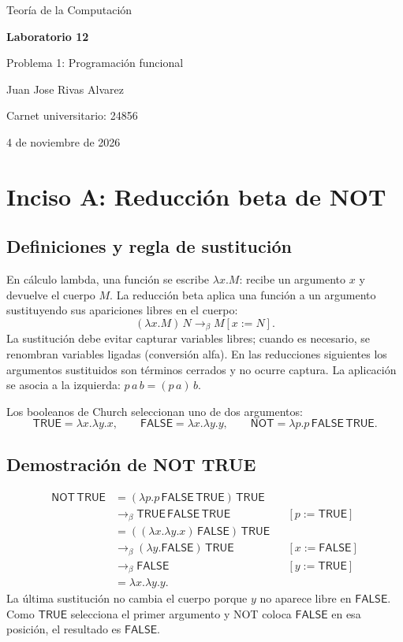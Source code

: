 \documentclass[11pt,a4paper]{article}
\newcommand{\TRUE}{\mathsf{TRUE}}
\newcommand{\FALSE}{\mathsf{FALSE}}
\newcommand{\NOT}{\mathsf{NOT}}
\begin{document}
\hypersetup{pageanchor=false}
\begin{titlepage}
    \centering
    \vspace*{2cm}
    {\Large Teoría de la Computación\par}
    \vspace{1.5cm}
    {\Huge\bfseries Laboratorio 12\par}
    \vspace{0.5cm}
    {\LARGE Problema 1: Programación funcional\par}
    \vspace{2cm}
    {\large Juan Jose Rivas Alvarez\par}
    {\large Carnet universitario: 24856\par}
    \vfill
    {\large 4 de noviembre de 2026\par}
\end{titlepage}
\hypersetup{pageanchor=true}

\section{Inciso A: Reducción beta de NOT}
\subsection{Definiciones y regla de sustitución}
En cálculo lambda, una función se escribe $\lambda x.M$: recibe un argumento
$x$ y devuelve el cuerpo $M$. La reducción beta aplica una función a un
argumento sustituyendo sus apariciones libres en el cuerpo:
\[
    (\lambda x.M)\,N \longrightarrow_\beta M[x:=N].
\]
La sustitución debe evitar capturar variables libres; cuando es necesario,
se renombran variables ligadas (conversión alfa). En las reducciones siguientes
los argumentos sustituidos son términos cerrados y no ocurre captura.
La aplicación se asocia a la izquierda: $p\,a\,b=(p\,a)\,b$.

Los booleanos de Church seleccionan uno de dos argumentos:
\[
    \TRUE=\lambda x.\lambda y.x,\qquad
    \FALSE=\lambda x.\lambda y.y,\qquad
    \NOT=\lambda p.p\,\FALSE\,\TRUE.
\]
\subsection{Demostración de NOT TRUE}
\begin{align*}
    \NOT\,\TRUE
    &= (\lambda p.p\,\FALSE\,\TRUE)\,\TRUE \\
    &\longrightarrow_\beta \TRUE\,\FALSE\,\TRUE
        && [p:=\TRUE] \\
    &= ((\lambda x.\lambda y.x)\,\FALSE)\,\TRUE \\
    &\longrightarrow_\beta (\lambda y.\FALSE)\,\TRUE
        && [x:=\FALSE] \\
    &\longrightarrow_\beta \FALSE
        && [y:=\TRUE] \\
    &= \lambda x.\lambda y.y.
\end{align*}
La última sustitución no cambia el cuerpo porque $y$ no aparece libre en
$\FALSE$. Como $\TRUE$ selecciona el primer argumento y NOT coloca
$\FALSE$ en esa posición, el resultado es $\FALSE$.
\end{document}
